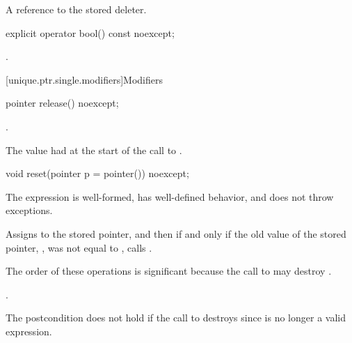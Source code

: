\begin{itemdescr}
\pnum
\returns
A reference to the stored deleter.
\end{itemdescr}

%
\begin{itemdecl}
explicit operator bool() const noexcept;
\end{itemdecl}

\begin{itemdescr}
\pnum
\returns
{}.
\end{itemdescr}

[unique.ptr.single.modifiers]{Modifiers}

%
\begin{itemdecl}
pointer release() noexcept;
\end{itemdecl}

\begin{itemdescr}
\pnum
\ensures
{}.

\pnum
\returns
The value  had at the start of
the call to .
\end{itemdescr}

\begin{indexed}{}
\begin{itemdecl}
void reset(pointer p = pointer()) noexcept;
\end{itemdecl}
\end{indexed}

\begin{itemdescr}
\pnum
\expects
The expression  is well-formed,
has well-defined behavior, and does not throw exceptions.

\pnum
\effects
Assigns  to the stored pointer, and then if and only if the old value of the
stored pointer, , was not equal to , calls
.
\begin{note}
The order of these operations is significant
because the call to  may destroy .
\end{note}

\pnum
\ensures
{}.
\begin{note}
The postcondition does not hold if the call to 
destroys  since  is no longer a valid expression.
\end{note}
\end{itemdescr}

